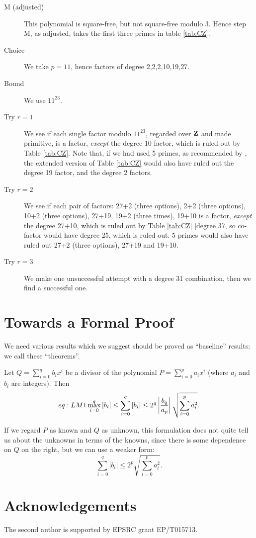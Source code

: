 \documentclass{llncs}
\begin{document}
\begin{description}
\item[M (adjusted)]
This polynomial is square-free, but not square-free modulo 3. Hence step M, as adjusted, takes the first three primes in table \ref{tab:CZ}.
\item[Choice]We take $p=11$, hence factors of degree 2,2,2,10,19,27. 
\item[Bound]We use $11^{23}$.  
\item[Try $r=1$]We see if each single factor modulo $11^{23}$, regarded over ${\bf Z}$ and made primitive, is a factor, \emph{except} the degree 10 factor, which is ruled out by Table \ref{tab:CZ}. Note that, if we had used 5 primes, as recommended by \cite{Musser1975a}, the extended version of Table \ref{tab:CZ} would also have ruled out the degree 19 factor, and the degree 2 factors.
\item[Try $r=2$]We see if each pair of factors: 27+2 (three options), 2+2 (three options), 10+2 (three options), 27+19, 19+2 (three times), 19+10 is a factor, \emph{except} the degree 27+10, which is ruled out by Table \ref{tab:CZ} [degree 37, so co-factor would have degree 25, which is ruled out. 5 primes would also have ruled out 27+2 (three options), 27+19 and 19+10.
\item[Try $r=3$]We make one unsuccessful attempt with a degree 31 combination, then we find a successful one.
\end{description}
\section{Towards a Formal Proof}
We need various results which we suggest should be proved as ``baseline'' results: we call these ``theorems''.
\begin{theorem}\label{thm:LM}
Let $Q = \sum_{i=0}^q{b_i x^i}$ be a divisor of the polynomial
$P=\sum_{i=0}^p{a_ix^i}$ (where $a_i$ and $b_i$ are integers). Then
\begin{equation}{eq:LM1}
\max_{i=0}^q\left\vert b_i \right\vert \le
\sum_{i=0}^q \left\vert b_i \right\vert \le
2^q \left\vert b_q \over a_p \right\vert \sqrt{\sum_{i=0}^p{a_i^2}} .
\end{equation}
\end{theorem}
\par
If we regard $P$ as known and $Q$ as unknown, this formulation does not quite
tell us about the unknowns in terms of the knowns, since there is some
dependence on $Q$ on the right, but we can use a weaker form:
\begin{equation}
\sum_{i=0}^q \left\vert b_i \right\vert \le
2^p \sqrt{\sum_{i=0}^p{a_i^2}} .
\end{equation}

\section*{Acknowledgements}The second author is supported by EPSRC grant EP/T015713.

\end{document}
